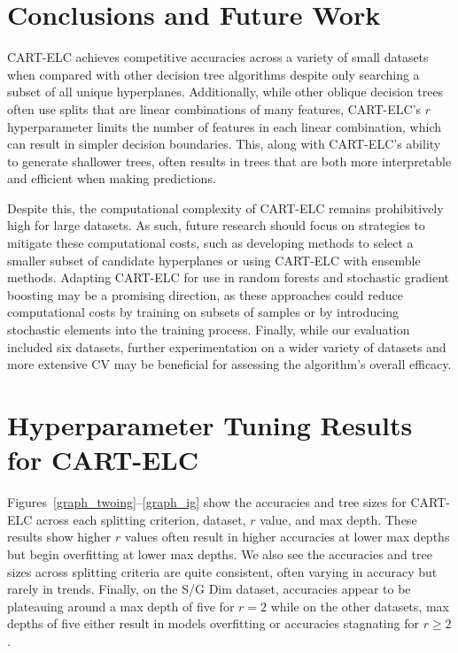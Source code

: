 \documentclass[10pt]{article} %
\begin{document}
\section{Conclusions and Future Work}\label{conclusions_and_future_work}

CART-ELC achieves competitive accuracies across a variety of small datasets when compared with other decision tree algorithms despite only searching a subset of all unique hyperplanes. Additionally, while other oblique decision trees often use splits that are linear combinations of many features, CART-ELC's $r$ hyperparameter limits the number of features in each linear combination, which can result in simpler decision boundaries. This, along with CART-ELC's ability to generate shallower trees, often results in trees that are both more interpretable and efficient when making predictions.

Despite this, the computational complexity of CART-ELC remains prohibitively high for large datasets. As such, future research should focus on strategies to mitigate these computational costs, such as developing methods to select a smaller subset of candidate hyperplanes or using CART-ELC with ensemble methods. Adapting CART-ELC for use in random forests \citep{rndfrst} and stochastic gradient boosting \citep{sgboost} may be a promising direction, as these approaches could reduce computational costs by training on subsets of samples or by introducing stochastic elements into the training process. Finally, while our evaluation included six datasets, further experimentation on a wider variety of datasets and more extensive CV may be beneficial for assessing the algorithm's overall efficacy.




\appendix

\newpage

\section{Hyperparameter Tuning Results for CART-ELC}\label{hyper_tuning}

Figures~\ref{graph_twoing}--\ref{graph_ig} show the accuracies and tree sizes for CART-ELC across each splitting criterion, dataset, $r$ value, and max depth. These results show higher $r$ values often result in higher accuracies at lower max depths but begin overfitting at lower max depths. We also see the accuracies and tree sizes across splitting criteria are quite consistent, often varying in accuracy but rarely in trends. Finally, on the S/G Dim dataset, accuracies appear to be plateauing around a max depth of five for $r=2$ while on the other datasets, max depths of five either result in models overfitting or accuracies stagnating for $r \geq 2$.
\end{document}
